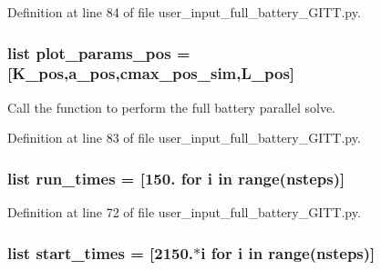 Definition at line 84 of file user\-\_\-input\-\_\-full\-\_\-battery\-\_\-\-G\-I\-T\-T.\-py.

\hypertarget{namespaceuser__input__full__battery___g_i_t_t_a5bacef25baf63731923fbef674af4e9d}{
\subsubsection[{plot\-\_\-params\-\_\-pos}]{\setlength{\rightskip}{0pt plus 5cm}list plot\-\_\-params\-\_\-pos = \mbox{[}{\bf K\-\_\-pos},a\-\_\-pos,{\bf cmax\-\_\-pos\-\_\-sim},L\-\_\-pos\mbox{]}}}\label{namespaceuser__input__full__battery___g_i_t_t_a5bacef25baf63731923fbef674af4e9d}


Call the function to perform the full battery parallel solve. 



Definition at line 83 of file user\-\_\-input\-\_\-full\-\_\-battery\-\_\-\-G\-I\-T\-T.\-py.

\hypertarget{namespaceuser__input__full__battery___g_i_t_t_a5a6deb885420d2b81e210e580767b1c1}{
\subsubsection[{run\-\_\-times}]{\setlength{\rightskip}{0pt plus 5cm}list run\-\_\-times = \mbox{[}150. for i in range({\bf nsteps})\mbox{]}}}\label{namespaceuser__input__full__battery___g_i_t_t_a5a6deb885420d2b81e210e580767b1c1}


Definition at line 72 of file user\-\_\-input\-\_\-full\-\_\-battery\-\_\-\-G\-I\-T\-T.\-py.

\hypertarget{namespaceuser__input__full__battery___g_i_t_t_a377a515511d37e8c7ac5501847d6485d}{
\subsubsection[{start\-\_\-times}]{\setlength{\rightskip}{0pt plus 5cm}list start\-\_\-times = \mbox{[}2150.$\ast$i for i in range({\bf nsteps})\mbox{]}}}\label{namespaceuser__input__full__battery___g_i_t_t_a377a515511d37e8c7ac5501847d6485d}



